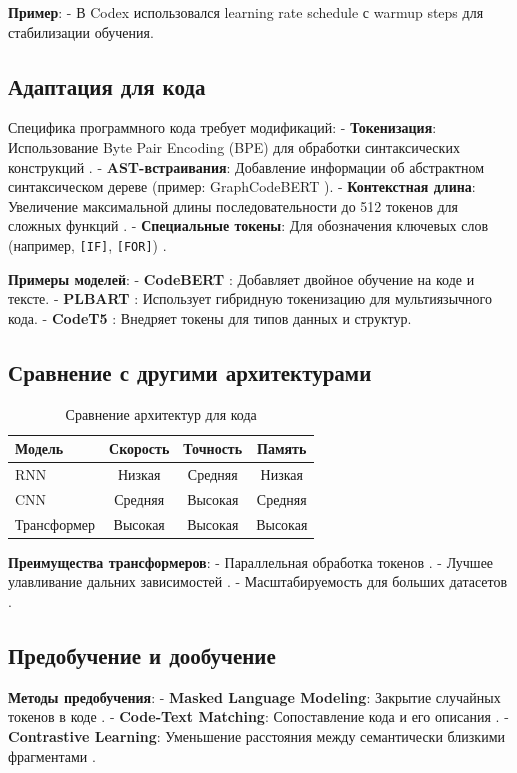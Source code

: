 \documentclass[14pt]{article}
\theoremstyle{definition}
\begin{document}
\textbf{Пример}:
- В Codex \cite{chen2021codex} использовался learning rate schedule с warmup steps для стабилизации обучения.

\subsection{Адаптация для кода}
Специфика программного кода требует модификаций:
- \textbf{Токенизация}: Использование Byte Pair Encoding (BPE) для обработки синтаксических конструкций \cite{zhu2022}.
- \textbf{AST-встраивания}: Добавление информации об абстрактном синтаксическом дереве (пример: GraphCodeBERT \cite{guo2022graphcodebert}).
- \textbf{Контекстная длина}: Увеличение максимальной длины последовательности до 512 токенов для сложных функций \cite{chen2023}.
- \textbf{Специальные токены}: Для обозначения ключевых слов (например, \texttt{[IF]}, \texttt{[FOR]}) \cite{wan2023codet5+}.

\textbf{Примеры моделей}:
- \textbf{CodeBERT} \cite{feng2020codebert}: Добавляет двойное обучение на коде и тексте.
- \textbf{PLBART} \cite{ahmad2021plbart}: Использует гибридную токенизацию для мультиязычного кода.
- \textbf{CodeT5} \cite{wang2021codet5}: Внедряет токены для типов данных и структур.

\subsection{Сравнение с другими архитектурами}
\begin{table}[h]
\centering
\begin{tabular}{|l|c|c|c|}
\hline
\textbf{Модель} & \textbf{Скорость} & \textbf{Точность} & \textbf{Память} \\ \hline
RNN & Низкая & Средняя & Низкая \\ 
CNN & Средняя & Высокая & Средняя \\ 
Трансформер & Высокая & Высокая & Высокая \\ \hline
\end{tabular}
\caption{Сравнение архитектур для кода \cite{liu2022survey}}
\end{table}

\textbf{Преимущества трансформеров}:
- Параллельная обработка токенов \cite{vaswani2017attention}.
- Лучшее улавливание дальних зависимостей \cite{guo2022graphcodebert}.
- Масштабируемость для больших датасетов \cite{karampatsis2020big}.

\subsection{Предобучение и дообучение}
\textbf{Методы предобучения}:
- \textbf{Masked Language Modeling}: Закрытие случайных токенов в коде \cite{feng2020codebert}.
- \textbf{Code-Text Matching}: Сопоставление кода и его описания \cite{lu2021codexglue}.
- \textbf{Contrastive Learning}: Уменьшение расстояния между семантически близкими фрагментами \cite{wan2023codet5+}.
\end{document}
